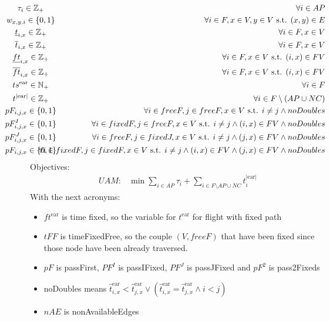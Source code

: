 \documentclass[../thesis.tex]{subfiles}
\begin{document}
{\begin{align}
&\mathclap{\tau_i\in \mathbb{Z}_+} &\forall i\in AP\nonumber\\
%
%
%
&\mathclap{w_{x,y,i}\in \{0,1\}} &\forall i\in F,x\in V,y\in V\text{ s.t. } (x,y)\in E \nonumber\\
&\mathclap{\underline t_{i,x}\in \mathbb{Z}_+} &\forall i\in F,x\in V \nonumber\\
&\mathclap{\overline  t_{i,x}\in \mathbb{Z}_+} &\forall i\in F,x\in V \nonumber\\
&\mathclap{\underline {ft}_{i,x}\in \mathbb{Z}_+} &\forall i\in F,x\in V \text{ s.t. } (i,x)\in FV\nonumber\\
&\mathclap{\overline  {ft}_{i,x}\in \mathbb{Z}_+} &\forall i\in F,x\in V \text{ s.t. } (i,x)\in FV\nonumber\\
&\mathclap{ts^\text{ear}\in \mathbb{N}_+} &\forall i\in F\nonumber \\
&\mathclap{t^\text{|ear|}\in \mathbb{Z}_+} &\forall i\in F\setminus(AP\cup NC)\nonumber \\
&\mathclap{pF_{i,j,x}\in \{0,1\}} &\forall i\in freeF,j\in freeF,x\in V\text{ s.t. } i\neq j\land noDoubles\nonumber\\
&\mathclap{pF^I_{i,j,x}\in \{0,1\}} &\forall i\in fixedF,j\in freeF,x\in V\text{ s.t. } i\neq j \land (i,x)\in FV \land noDoubles \nonumber\\
&\mathclap{pF^J_{i,j,x}\in \{0,1\}} &\forall i\in freeF,j\in fixedJ,x\in V\text{ s.t. } i\neq j \land (j,x)\in FV \land noDoubles \nonumber\\
&\mathclap{pF_{i,j,x}\in \{0,1\}} &\forall i\in fixedF,j\in fixedF,x\in V\text{ s.t. } i\neq j\land (i,x)\in FV\land (j,x)\in FV \land noDoubles\nonumber
\end{align}
Objectives:
\begin{align}
    UAM:&\min \sum_{i\in AP} \tau_i + \sum_{i\in F\setminus{AP\cup NC}} t^\text{|ear|}_i
\end{align}
}
With the next acronyms:
\begin{itemize}
    \item $ft^\text{ear}$ is time fixed, so the variable for $t^\text{ear}$ for flight with fixed path
    \item $tFF$ is timeFixedFree, so the couple $(V,freeF)$ that have been fixed since those node have been already traversed.
    \item $pF$ is passFirst, $PF^I$ is passIFixed, $PF^J$ is passJFixed and $pF^2$ is pass2Fixeds
    \item noDoubles means $\hat t^\text{ear}_{i,x} <\hat t^\text{ear}_{j,x} \lor (\hat t^\text{ear}_{i,x} = \hat t^\text{ear}_{j,x}\land i<j)$
    \item $nAE$ is nonAvailableEdges
\end{itemize}
\end{document}
